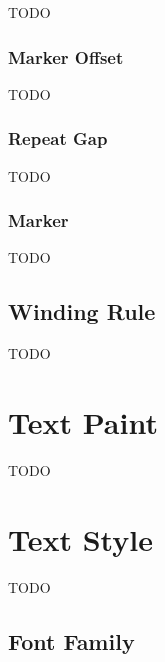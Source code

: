 
TODO


\subsubsection{Marker Offset}\label{sec:markeroffset}


TODO


\subsubsection{Repeat Gap}\label{sec:repeatgap}


TODO


\subsubsection{Marker }\label{sec:markerpaint}


TODO


\subsection{Winding Rule}\label{sec:winding}


TODO


\section{Text Paint}\label{sec:textpaint}


TODO


\section{Text Style}\label{sec:textstyle}

TODO


\subsection{Font Family}\label{sec:fontfamily}


